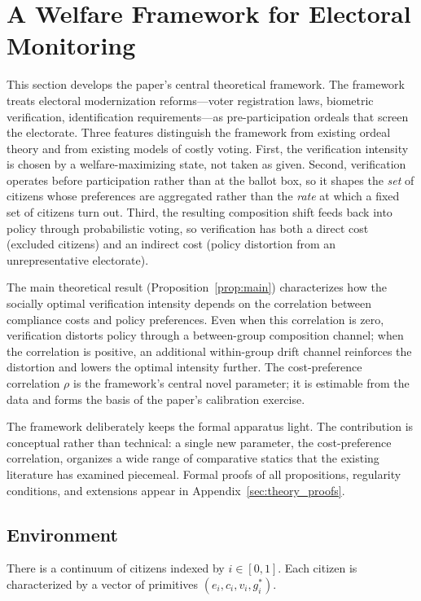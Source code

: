 \section{A Welfare Framework for Electoral Monitoring}
\label{sec:theory}

This section develops the paper's central theoretical framework. The framework treats electoral modernization reforms---voter registration laws, biometric verification, identification requirements---as pre-participation ordeals that screen the electorate. Three features distinguish the framework from existing ordeal theory and from existing models of costly voting. First, the verification intensity is chosen by a welfare-maximizing state, not taken as given. Second, verification operates before participation rather than at the ballot box, so it shapes the \emph{set} of citizens whose preferences are aggregated rather than the \emph{rate} at which a fixed set of citizens turn out. Third, the resulting composition shift feeds back into policy through probabilistic voting, so verification has both a direct cost (excluded citizens) and an indirect cost (policy distortion from an unrepresentative electorate).

The main theoretical result (Proposition~\ref{prop:main}) characterizes how the socially optimal verification intensity depends on the correlation between compliance costs and policy preferences. Even when this correlation is zero, verification distorts policy through a between-group composition channel; when the correlation is positive, an additional within-group drift channel reinforces the distortion and lowers the optimal intensity further. The cost-preference correlation $\rho$ is the framework's central novel parameter; it is estimable from the data and forms the basis of the paper's calibration exercise.

The framework deliberately keeps the formal apparatus light. The contribution is conceptual rather than technical: a single new parameter, the cost-preference correlation, organizes a wide range of comparative statics that the existing literature has examined piecemeal. Formal proofs of all propositions, regularity conditions, and extensions appear in Appendix~\ref{sec:theory_proofs}.

\subsection{Environment}
\label{ssec:environment}

There is a continuum of citizens indexed by $i \in [0, 1]$. Each citizen is characterized by a vector of primitives $(e_i, c_i, v_i, g_i^*)$.

